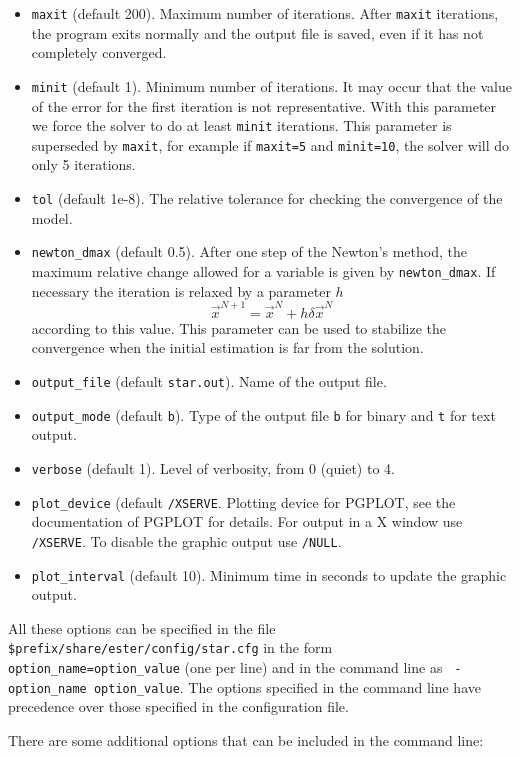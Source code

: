 \begin{itemize}
\item {\tt maxit} (default 200).
Maximum number of iterations. After {\tt maxit} iterations, the program
exits normally and the output file is saved, even if it has not completely converged.
\item {\tt minit} (default 1).
Minimum number of iterations. It may occur that the value of the error
for the first iteration is not representative. With this parameter we force the solver to
do at least {\tt minit} iterations. This parameter is superseded by {\tt maxit}, for example
if {\tt maxit=5} and {\tt minit=10}, the solver will do only 5 iterations.
\item {\tt tol} (default 1e-8). 
The relative tolerance for checking the convergence of the model.
\item {\tt newton\_dmax} (default 0.5).
After one step of the Newton's method, the maximum relative change
allowed for a variable is given by {\tt newton\_dmax}. If necessary the iteration is relaxed
by a parameter $h$
$$\vec x^{N+1}=\vec x^N+h \delta\vec x^N$$
according to this value.
This parameter can be used to stabilize the convergence when the initial estimation is far
from the solution.
\item {\tt output\_file} (default {\tt star.out}). Name of the output file.
\item {\tt output\_mode} (default {\tt b}). Type of the output file {\tt b} for binary
and {\tt t} for text output.
\item {\tt verbose} (default 1). Level of verbosity, from 0 (quiet) to 4.
\item {\tt plot\_device} (default {\tt /XSERVE}. Plotting device for PGPLOT, 
see the documentation of PGPLOT for details. For output in a X window use {\tt /XSERVE}.
To disable the graphic output use {\tt /NULL}.
\item {\tt plot\_interval} (default 10). Minimum time in seconds to update the graphic output.
\end{itemize}

All these options can be specified in the file 
\texttt{\$prefix/share/ester/config/star.cfg} in the form {\tt
option\_name=option\_value} (one per line) and in the command line as {\tt
-option\_name option\_value}.
The options specified in the command line have precedence over those specified
in the configuration file.

\bigskip
There are some additional options that can be included in the command line:

